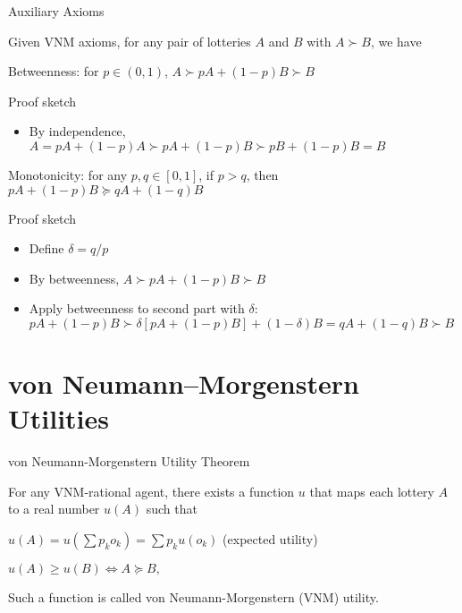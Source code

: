 \documentclass[11pt,aspectratio=169]{beamer}
\begin{document}
  \begin{frame}{Auxiliary Axioms}
   \begin{Lemma}
    Given VNM axioms, for any pair of lotteries $A$ and $B$ with $A \succ B$, we have
    \begin{itemizes}[1em]
     \item<1->\alert<1>{Betweenness}: for $p\in (0,1)$, $A \succ pA + (1-p)B \succ B$
      \item<3->[] {\color{blue} Proof sketch}
     \begin{itemize}
      \item By independence, $A = pA + (1-p)A \succ pA + (1-p)B \succ pB + (1-p) B = B$
     \end{itemize}
     \item<2->\alert<2>{Monotonicity}: for any $p,q\in [0,1]$, if $p > q$, then $pA + (1-p)B \succeq qA + (1-q)B$
     \item<4->[] {\color{blue} Proof sketch}
     \begin{itemize}
      \item Define $\delta = q/p$
      \item By betweenness, $A\succ pA + (1-p)B \succ B$
      \item Apply betweenness to second part with $\delta$: $pA + (1-p)B \succ \delta[pA  + (1-p)B] + (1-\delta) B = qA + (1-q)B \succ B$
     \end{itemize}
    \end{itemizes}
   \end{Lemma}
  \end{frame}
  
 \section{von Neumann–Morgenstern Utilities}
  \begin{frame}{von Neumann-Morgenstern Utility Theorem}
   \begin{theorem}
    For any VNM-rational agent, there exists a function $u$ that maps each lottery $A$ to a real number $u(A)$ such that 
    \begin{itemizes}
     \item $u(A) = u\left(\sum p_k o_k\right) = \sum p_k u(o_k)$ (\alert{expected utility})
     \item $u(A) \ge u(B) \Longleftrightarrow A \succeq B,$
    \end{itemizes}
    \vspace{1em}
    Such a function is called von Neumann-Morgenstern (VNM) utility. 
   \end{theorem}
  \end{frame}
  
\end{document}
